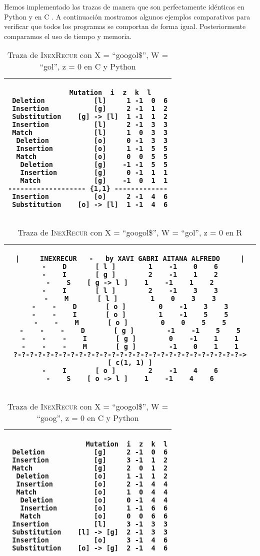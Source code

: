 \documentclass{article}
\newcommand{\tempcaption}{}
\newenvironment{code}[4]{
\begin{table}[h!]
\gdef\tempcaption{Traza de \textsc{InexRecur} con X = ``#1'', W = ``#2'', z = #3 en #4}
\centering
\begin{tabular}{|c|}
\hline }
{\\\hline
\end{tabular}
\caption{\tempcaption}
\end{table} }
\newcommand{\C}{C }
\newcommand{\R}{R }
\newcommand{\python}{Python }
\begin{document}
Hemos implementado las trazas de manera que son perfectamente
idénticas en \python y en \C. A continuación mostramos algunos
ejemplos comparativos para verificar que todos los programas se
comportan de forma igual. Posteriormente comparamos el uso de
tiempo y memoria.
\\
\begin{code}{googol\$}{gol}{0}{\C y \python}
\begin{lstlisting}
		   Mutation  i  z  k  l
 Deletion            [l]     1 -1  0  6
 Insertion           [g]     2 -1  1  2
 Substitution    [g] -> [l]  1 -1  1  2
 Insertion           [l]     2 -1  3  3
 Match               [l]     1  0  3  3
  Deletion           [o]     0 -1  3  3
  Insertion          [o]     1 -1  5  5
  Match              [o]     0  0  5  5
   Deletion          [g]    -1 -1  5  5
   Insertion         [g]     0 -1  1  1
   Match             [g]    -1  0  1  1
------------------- {1,1} -------------
 Insertion           [o]     2 -1  4  6
 Substitution    [o] -> [l]  1 -1  4  6
\end{lstlisting}
\end{code}
\phantom{}
\vfill
\begin{code}{googol\$}{gol}{0}{\R}
\begin{lstlisting}
|     INEXRECUR   -   by XAVI GABRI AITANA ALFREDO     |
-    D       [ l ]        1    -1    0    6
-    I       [ g ]        2    -1    1    2
-    S    [ g -> l ]    1    -1    1    2
-    I       [ l ]        2    -1    3    3
-    M       [ l ]        1    0    3    3
-    -    D       [ o ]        0    -1    3    3
-    -    I       [ o ]        1    -1    5    5
-    -    M       [ o ]        0    0    5    5
-    -    -    D       [ g ]        -1    -1    5    5
-    -    -    I       [ g ]        0    -1    1    1
-    -    -    M       [ g ]        -1    0    1    1
?-?-?-?-?-?-?-?-?-?-?-?-?-?-?-?-?-?-?-?-?-?-?-?-?-?-?-?->  [ c(1, 1) ]
-    I       [ o ]        2    -1    4    6
-    S    [ o -> l ]    1    -1    4    6
\end{lstlisting}
\end{code}
\vfill
\clearpage
\phantom{}
\vspace{1cm}
\begin{code}{googol\$}{goog}{0}{\C y \python}
\begin{lstlisting}
                   Mutation  i  z  k  l
 Deletion            [g]     2 -1  0  6
 Insertion           [g]     3 -1  1  2
 Match               [g]     2  0  1  2
  Deletion           [o]     1 -1  1  2
  Insertion          [o]     2 -1  4  4
  Match              [o]     1  0  4  4
   Deletion          [o]     0 -1  4  4
   Insertion         [o]     1 -1  6  6
   Match             [o]     0  0  6  6
 Insertion           [l]     3 -1  3  3
 Substitution    [l] -> [g]  2 -1  3  3
 Insertion           [o]     3 -1  4  6
 Substitution    [o] -> [g]  2 -1  4  6
\end{lstlisting}
\end{code}
\end{document}
